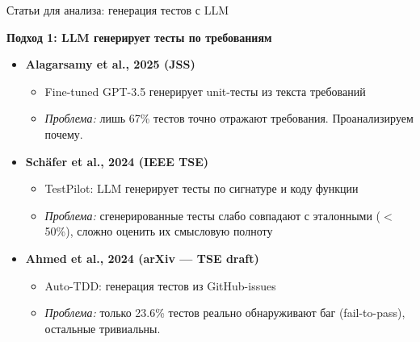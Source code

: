 \begin{frame}{Статьи для анализа: генерация тестов с LLM}

\textbf{Подход 1: LLM генерирует тесты по требованиям}

\vspace{0.3cm}

\begin{itemize}
    \item \textbf{Alagarsamy et al., 2025 (JSS)}
    \begin{itemize}
        \item Fine-tuned GPT-3.5 генерирует unit-тесты из текста требований
        \item \textit{Проблема:} лишь 67\% тестов точно отражают требования. Проанализируем почему.
    \end{itemize}

    \vspace{0.2cm}

    \item \textbf{Schäfer et al., 2024 (IEEE TSE)}
    \begin{itemize}
        \item TestPilot: LLM генерирует тесты по сигнатуре и коду функции
        \item \textit{Проблема:} сгенерированные тесты слабо совпадают с эталонными ($<$50\%), сложно оценить их смысловую полноту
    \end{itemize}

    \vspace{0.2cm}

    \item \textbf{Ahmed et al., 2024 (arXiv — TSE draft)}
    \begin{itemize}
        \item Auto-TDD: генерация тестов из GitHub-issues
        \item \textit{Проблема:} только 23.6\% тестов реально обнаруживают баг (fail-to-pass), остальные тривиальны. 
    \end{itemize}
\end{itemize}

\end{frame}